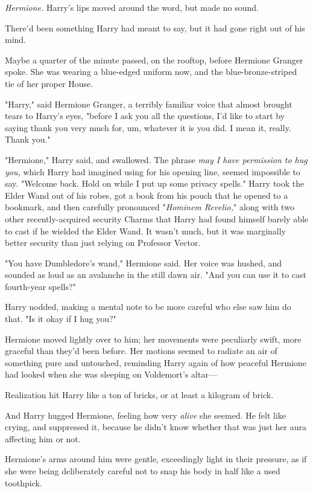 \emph{Hermione.} Harry's lips moved around the word, but made no sound.

There'd been something Harry had meant to say, but it had gone right out of his
mind.

Maybe a quarter of the minute passed, on the rooftop, before Hermione Granger
spoke. She was wearing a blue-edged uniform now, and the blue-bronze-striped
tie of her proper House.

"Harry," said Hermione Granger, a terribly familiar voice that almost brought
tears to Harry's eyes, "before I ask you all the questions, I'd like to start
by saying thank you very much for, um, whatever it is you did. I mean it,
really. Thank you."

"Hermione," Harry said, and swallowed. The phrase \emph{may I have permission
to hug you,} which Harry had imagined using for his opening line, seemed
impossible to say. "Welcome back. Hold on while I put up some privacy spells."
Harry took the Elder Wand out of his robes, got a book from his pouch that he
opened to a bookmark, and then carefully pronounced "\emph{Hominem Revelio,}"
along with two other recently-acquired security Charms that Harry had found
himself barely able to cast if he wielded the Elder Wand. It wasn't much, but
it was marginally better security than just relying on Professor Vector.

"You have Dumbledore's wand," Hermione said. Her voice was hushed, and sounded
as loud as an avalanche in the still dawn air. "And you can use it to cast
fourth-year spells?"

Harry nodded, making a mental note to be more careful who else saw him do that.
"Is it okay if I hug you?"

Hermione moved lightly over to him; her movements were peculiarly swift, more
graceful than they'd been before. Her motions seemed to radiate an air of
something pure and untouched, reminding Harry again of how peaceful Hermione
had looked when she was sleeping on Voldemort's altar---

Realization hit Harry like a ton of bricks, or at least a kilogram of brick.

And Harry hugged Hermione, feeling how very \emph{alive} she seemed. He felt
like crying, and suppressed it, because he didn't know whether that was just
her aura affecting him or not.

Hermione's arms around him were gentle, exceedingly light in their pressure, as
if she were being deliberately careful not to snap his body in half like a used
toothpick.

